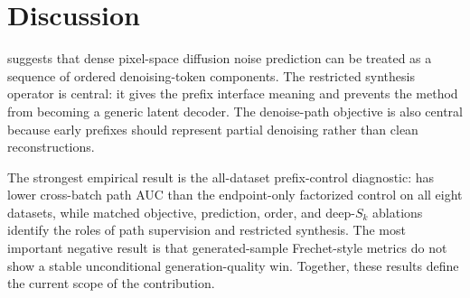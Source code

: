 \section{Discussion}

\method{} suggests that dense pixel-space diffusion noise prediction can be
treated as a sequence of ordered denoising-token components. The restricted
synthesis operator is central: it gives the prefix interface meaning and
prevents the method from becoming a generic latent decoder. The denoise-path
objective is also central because early prefixes should represent partial
denoising rather than clean reconstructions.

The strongest empirical result is the all-dataset prefix-control diagnostic:
\method{} has lower cross-batch path AUC than the endpoint-only factorized control on all
eight datasets, while matched objective, prediction, order, and deep-$S_k$
ablations identify the roles of path supervision and restricted synthesis. The most important negative result is that
generated-sample Frechet-style metrics do not show a stable unconditional
generation-quality win. Together, these results define the current scope of the
contribution.
